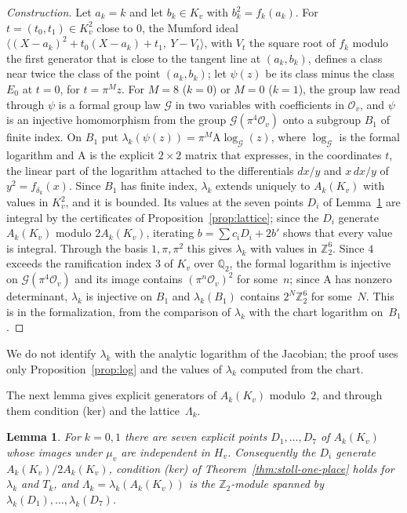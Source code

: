 \documentclass[11pt]{amsart}
\newtheorem{lemma}[theorem]{Lemma}
\theoremstyle{definition}
\numberwithin{equation}{section}
\newcommand{\Qt}{\mathbb{Q}_2}
\newcommand{\Zt}{\mathbb{Z}_2}
\newcommand{\Ov}{\mathcal{O}_v}
\newcommand{\kv}{K_v}
\newcommand{\lean}[1]{\ignorespaces}
\begin{document}
\begin{proof}[Construction]
Let $a_k=k$ and let $b_k\in\kv$ with $b_k^2=f_k(a_k)$. For $t=(t_0,t_1)\in\kv^2$ close to $0$, the Mumford ideal $\langle(X-a_k)^2+t_0(X-a_k)+t_1,\ Y-V_t\rangle$, with $V_t$ the square root of $f_k$ modulo the first generator that is close to the tangent line at $(a_k,b_k)$, defines a class near twice the class of the point $(a_k,b_k)$; let $\psi(z)$ be its class minus the class $E_0$ at $t=0$, for $t=\pi^{M}z$. For $M=8$ ($k=0$) or $M=0$ ($k=1$), the group law read through $\psi$ is a formal group law $\mathcal G$ in two variables with coefficients in $\Ov$, and $\psi$ is an injective homomorphism from the group $\mathcal G(\pi^4\Ov)$ onto a subgroup $B_1$ of finite index. On $B_1$ put $\lambda_k(\psi(z))=\pi^{M}\mathrm A\log_{\mathcal G}(z)$, where $\log_{\mathcal G}$ is the formal logarithm and $\mathrm A$ is the explicit $2\times2$ matrix that expresses, in the coordinates $t$, the linear part of the logarithm attached to the differentials $dx/y$ and $x\,dx/y$ of $y^2=f_{\delta_k}(x)$. Since $B_1$ has finite index, $\lambda_k$ extends uniquely to $A_k(\kv)$ with values in $\kv^2$, and it is bounded. Its values at the seven points $D_i$ of Lemma~\ref{lem:local-divisors} are integral by the certificates of Proposition~\ref{prop:lattice}; since the $D_i$ generate $A_k(\kv)$ modulo $2A_k(\kv)$, iterating $b=\sum c_iD_i+2b'$ shows that every value is integral. Through the basis $1,\pi,\pi^2$ this gives $\lambda_k$ with values in $\Zt^6$. Since $4$ exceeds the ramification index $3$ of $\kv$ over $\Qt$, the formal logarithm
 is injective on $\mathcal G(\pi^4\Ov)$ and its image contains $(\pi^n\Ov)^2$ for some~$n$; since $\mathrm A$ has nonzero determinant, $\lambda_k$ is injective on $B_1$ and $\lambda_k(B_1)$ contains $2^N\Zt^6$ for some~$N$. This is  in the formalization, from the comparison of $\lambda_k$ with the chart logarithm on~$B_1$.
\end{proof}

We do not identify $\lambda_k$ with the analytic logarithm of the Jacobian; the proof uses only Proposition~\ref{prop:log} and the values of $\lambda_k$ computed from the chart.

The next lemma gives explicit generators of $A_k(\kv)$ modulo~$2$, and through them condition (ker) and the lattice~$\Lambda_k$.

\begin{lemma}\label{lem:local-divisors}\lean{FurioLombardo.Discharge.SelmerSpan.indep_Dpt, FurioLombardo.Discharge.M4Log.genModTwo_Dpt, FurioLombardo.M3a.Route.hker_jac, FurioLombardo.M3a.hker_of_torsion, FurioLombardo.Discharge.Analytic.logKernelTorsion_of_chart, FurioLombardo.Discharge.M4Box.hLam_k}
For $k=0,1$ there are seven explicit points $D_1,\dots,D_7$ of $A_k(\kv)$ whose images under $\mu_v$ are independent in $H_v$. Consequently the $D_i$ generate $A_k(\kv)/2A_k(\kv)$, condition (ker) of Theorem~\ref{thm:stoll-one-place} holds for $\lambda_k$ and $T_k$, and $\Lambda_k=\lambda_k(A_k(\kv))$ is the $\Zt$-module spanned by $\lambda_k(D_1),\dots,\lambda_k(D_7)$.
\end{lemma}
\end{document}
